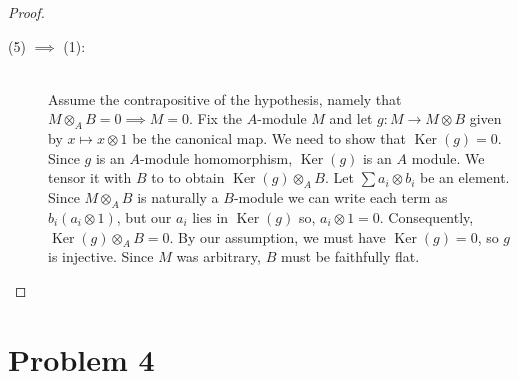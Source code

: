 \documentclass{article}
\newcommand{\tensor}{\otimes}
\DeclareMathOperator{\Ker}{Ker}
\begin{document}
\begin{proof}
\begin{description}
            \item [(5) $\implies$ (1):]\hfill\\
                Assume the contrapositive of the hypothesis, namely that
                $M\tensor_A B = 0 \implies M = 0$. Fix the $A$-module $M$ and
                let $g: M \to M \tensor B$ given by $x \mapsto x \tensor 1$ be
                the canonical map. We need to show that $\Ker(g) = 0$.  Since
                $g$ is an $A$-module homomorphism, $\Ker(g)$ is an $A$ module.
                We tensor it with $B$ to to obtain $\Ker(g) \tensor_A B$. Let
                $\sum a_i \tensor b_i$ be an element. Since $M \tensor_A B$ is
                naturally a $B$-module we can write each term as $b_i(a_i
                \tensor 1)$, but our $a_i$ lies in $\Ker(g)$ so, $a_i \tensor 1
                = 0$.  Consequently, $\Ker(g) \tensor_A B = 0$. By our
                assumption, we must have $\Ker(g) = 0$, so $g$ is injective.
                Since $M$ was arbitrary, $B$ must be faithfully flat.
        \end{description}
    \end{proof}

\section*{Problem 4}
\label{sec:problem_4}
\end{document}
